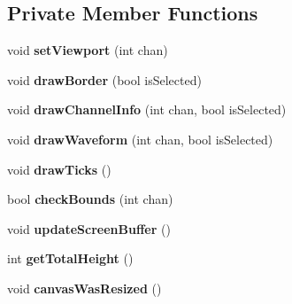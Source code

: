 \subsection*{Private Member Functions}
\begin{DoxyCompactItemize}
\item 
\hypertarget{classLfpDisplayCanvas_a4ea0c0ccdfea78df6d005f846777d954}{void {\bfseries set\-Viewport} (int chan)}\label{classLfpDisplayCanvas_a4ea0c0ccdfea78df6d005f846777d954}

\item 
\hypertarget{classLfpDisplayCanvas_a3d72f13693b2d9ba8771b882f12934d2}{void {\bfseries draw\-Border} (bool is\-Selected)}\label{classLfpDisplayCanvas_a3d72f13693b2d9ba8771b882f12934d2}

\item 
\hypertarget{classLfpDisplayCanvas_ab24e9d1314dfa254b428b224caf4b6d8}{void {\bfseries draw\-Channel\-Info} (int chan, bool is\-Selected)}\label{classLfpDisplayCanvas_ab24e9d1314dfa254b428b224caf4b6d8}

\item 
\hypertarget{classLfpDisplayCanvas_af4c6a9771a6520959b21e7c4eccc59b0}{void {\bfseries draw\-Waveform} (int chan, bool is\-Selected)}\label{classLfpDisplayCanvas_af4c6a9771a6520959b21e7c4eccc59b0}

\item 
\hypertarget{classLfpDisplayCanvas_a741e76ee094b6d3c5745c5f787259779}{void {\bfseries draw\-Ticks} ()}\label{classLfpDisplayCanvas_a741e76ee094b6d3c5745c5f787259779}

\item 
\hypertarget{classLfpDisplayCanvas_aa26e3f1373b9f9c89a0180e2e37d59ac}{bool {\bfseries check\-Bounds} (int chan)}\label{classLfpDisplayCanvas_aa26e3f1373b9f9c89a0180e2e37d59ac}

\item 
\hypertarget{classLfpDisplayCanvas_acd9d9ff39590a4ee2be36655b194f99a}{void {\bfseries update\-Screen\-Buffer} ()}\label{classLfpDisplayCanvas_acd9d9ff39590a4ee2be36655b194f99a}

\item 
\hypertarget{classLfpDisplayCanvas_ac213eb3659a6e4dcd4adb78ca9a58d24}{int {\bfseries get\-Total\-Height} ()}\label{classLfpDisplayCanvas_ac213eb3659a6e4dcd4adb78ca9a58d24}

\item 
\hypertarget{classLfpDisplayCanvas_a0c38574ab7a847f8fd3aba7e00803772}{void {\bfseries canvas\-Was\-Resized} ()}\label{classLfpDisplayCanvas_a0c38574ab7a847f8fd3aba7e00803772}


\end{DoxyCompactItemize}
